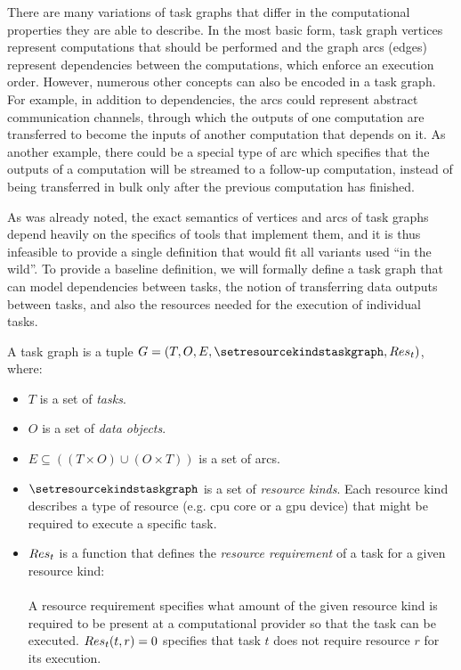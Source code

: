 There are many variations of task graphs that differ in the computational properties they are able
to describe. In the most basic form, task graph vertices represent computations that should be
performed and the graph arcs (edges) represent dependencies between the computations, which enforce
an execution order. However, numerous other concepts can also be encoded in a task graph. For
example, in addition to dependencies, the arcs could represent abstract communication channels,
through which the outputs of one computation are transferred to become the inputs of another
computation that depends on it. As another example, there could be a special type of arc which
specifies that the outputs of a computation will be streamed to a follow-up computation, instead of
being transferred in bulk only after the previous computation has finished.

As was already noted, the exact semantics of vertices and arcs of task graphs depend heavily on the
specifics of tools that implement them, and it is thus infeasible to provide a single definition
that would fit all variants used ``in the wild''. To provide a baseline definition, we will
formally define a task graph that can model dependencies between tasks, the notion of transferring
data outputs between tasks, and also the resources needed for the execution of individual tasks.

\newcommand{\alltaskpairs}{\forall t_1\in{}T, \forall t_2\in{}T}

\vspace{2mm} A task graph is a tuple $G = (T, O, E, \setresourcekindstaskgraph, \fntaskres)$, where:
\begin{itemize}[itemsep=0pt]
	\item $T$ is a set of \emph{tasks}.
	\item $O$ is a set of \emph{data objects}.
	\item $E \subseteq ((T\times{}O) \cup (O\times{}T))$ is a set of arcs.
	\item $\setresourcekindstaskgraph$ is a set of \emph{resource kinds}. Each resource kind
	      describes a type of resource (e.g. \gls{cpu} core or a \gls{gpu} device)
	      that might be required to execute a specific task.
	\item $Res_t$ is a function that defines the
	      \emph{resource requirement} of a task for a given resource kind: \\
	       \\
	      A resource requirement specifies what amount of the given resource kind is required to be present
	      at a computational provider so that the task can be executed. $Res_t(t, r) = 0$ specifies that
	      task $t$ does not require resource $r$ for its execution.
\end{itemize}

